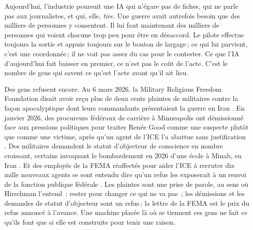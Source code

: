Aujourd'hui, l'industrie poursuit une IA qui n'égare pas de fiches, qui ne parle pas aux journalistes, et qui, elle, \emph{tire}. Une guerre avait autrefois besoin que des milliers de personnes y consentent. Il lui faut maintenant des milliers de personnes qui voient chacune trop peu pour être en désaccord. Le pilote effectue toujours la sortie et appuie toujours sur le bouton de largage\,; ce qui lui parvient, c'est une coordonnée\,; il ne voit pas assez du cas pour le contester. Ce que l'IA d'aujourd'hui fait baisser en premier, ce n'est pas le coût de l'acte. C'est le nombre de gens qui savent ce qu'est l'acte avant qu'il ait lieu.

Des gens refusent encore. Au 6 mars 2026, la Military Religious Freedom Foundation disait avoir reçu plus de deux cents plaintes de militaires contre la façon apocalyptique dont leurs commandants présentaient la guerre en Iran \autocite{Snopes2026MRFF}. En janvier 2026, des procureurs fédéraux de carrière à Minneapolis ont démissionné face aux pressions politiques pour traiter Renée Good comme une suspecte plutôt que comme une victime, après qu'un agent de l'ICE l'a abattue sans justification \autocite{Kaplan2026MinnProsecutors,CBS2026MinnFraudProsecutors,Wikipedia2026ReneeGood}. Des militaires demandent le statut d'objecteur de conscience en nombre croissant, certains invoquant le bombardement en 2026 d'une école à Minab, en Iran \autocite{Sridhar2026CO}. Et des employés de la FEMA réaffectés pour aider l'ICE à recruter dix mille nouveaux agents se sont entendu dire qu'un refus les exposerait à un renvoi de la fonction publique fédérale \autocite{Dayen2025FEMAICE,Stanton2026FEMALetter}. Les plaintes sont une prise de parole, au sens où Hirschman l'entend~: rester pour changer ce qui ne va pas \autocite{hirschman1970exit}\,; les démissions et les demandes de statut d'objecteur sont un refus\,; la lettre de la FEMA est le prix du refus annoncé à l'avance. Une machine placée là où se tiennent ces gens ne fait ce qu'ils font que si elle est construite pour tenir une raison.

